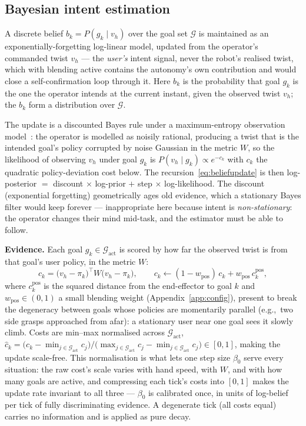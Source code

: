 \documentclass[12pt,a4paper,twoside,openright]{report}
\begin{document}
\subsection{Bayesian intent estimation}
\label{sec:belief}

A discrete belief $b_k = P(g_k \mid v_h)$ over the goal set $\mathcal{G}$ is maintained as an exponentially-forgetting log-linear model, updated from the operator's commanded twist $v_h$ --- the \emph{user's} intent signal, never the robot's realised twist, which with blending active contains the autonomy's own contribution and would close a self-confirmation loop through it. Here $b_k$ is the probability that goal $g_k$ is the one the operator intends at the current instant, given the observed twist $v_h$; the $b_k$ form a distribution over $\mathcal{G}$.

The update is a discounted Bayes rule under a maximum-entropy observation model~\cite{ziebart2008maxent,baker2009action,dragan2013policy}: the operator is modelled as noisily rational, producing a twist that is the intended goal's policy corrupted by noise Gaussian in the metric $W$, so the likelihood of observing $v_h$ under goal $g_k$ is $P(v_h \mid g_k) \propto e^{-c_k}$ with $c_k$ the quadratic policy-deviation cost below. The recursion~\eqref{eq:beliefupdate} is then log-posterior $=$ discount $\times$ log-prior $+$ step $\times$ log-likelihood. The discount (exponential forgetting) geometrically ages old evidence, which a stationary Bayes filter would keep forever --- inappropriate here because intent is \emph{non-stationary}: the operator changes their mind mid-task, and the estimator must be able to follow.

\textbf{Evidence.} Each goal $g_k \in \mathcal{G}_{\text{act}}$ is scored by how far the observed twist is from that goal's user policy, in the metric $W$:
\begin{equation}
c_k = \bigl(v_h - \pi_k\bigr)^{\top} W \bigl(v_h - \pi_k\bigr),
\qquad
c_k \leftarrow (1-w_{\text{pos}})\,c_k + w_{\text{pos}}\,c_k^{\text{pos}},
\label{eq:cost-belief}
\end{equation}
where $c_k^{\text{pos}}$ is the squared distance from the end-effector to goal $k$ and $w_{\text{pos}} \in (0,1)$ a small blending weight (Appendix~\ref{app:config}), present to break the degeneracy between goals whose policies are momentarily parallel (e.g.,\ two side grasps approached from afar): a stationary user near one goal sees it slowly climb. Costs are min--max normalised across $\mathcal{G}_{\text{act}}$,
$\hat{c}_k = \bigl(c_k - \min_{j \in \mathcal{G}_{\text{act}}} c_j\bigr)\big/\bigl(\max_{j \in \mathcal{G}_{\text{act}}} c_j - \min_{j \in \mathcal{G}_{\text{act}}} c_j\bigr) \in [0,1]$, making the update scale-free. This normalisation is what lets one step size $\beta_0$ serve every situation: the raw cost's scale varies with hand speed, with $W$, and with how many goals are active, and compressing each tick's costs into $[0,1]$ makes the update rate invariant to all three --- $\beta_0$ is calibrated once, in units of log-belief per tick of fully discriminating evidence. A degenerate tick (all costs equal) carries no information and is applied as pure decay.
\end{document}

